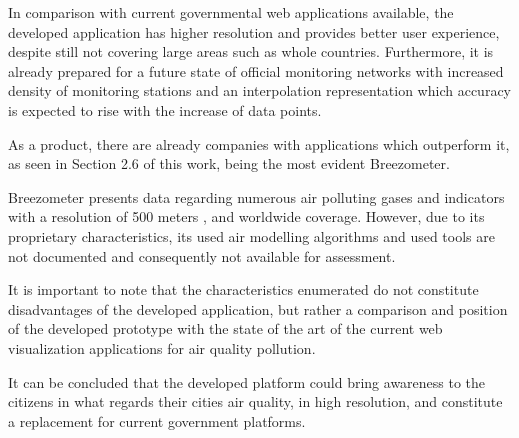 In comparison with current governmental web applications available, the developed application has higher resolution and provides better user experience, despite still not covering large areas such as whole countries. Furthermore, it is already prepared for a future state of official monitoring networks with increased density of monitoring stations and an interpolation representation which accuracy is expected to rise with the increase of data points.

As a product, there are already companies with applications which outperform it, as seen in Section 2.6 of this work, being the most evident Breezometer.

Breezometer presents data regarding numerous air polluting gases and indicators with a resolution of 500 meters \cite{Breezometer}, and worldwide coverage. However, due to its proprietary characteristics, its used air modelling algorithms and used tools are not documented and consequently not available for assessment.

It is important to note that the characteristics enumerated do not constitute disadvantages of the developed application, but rather a comparison and position of the developed prototype with the state of the art of the current web visualization applications for air quality pollution.

It can be concluded that the developed platform could bring awareness to the citizens in what regards their cities air quality, in high resolution, and constitute a replacement for current government platforms.